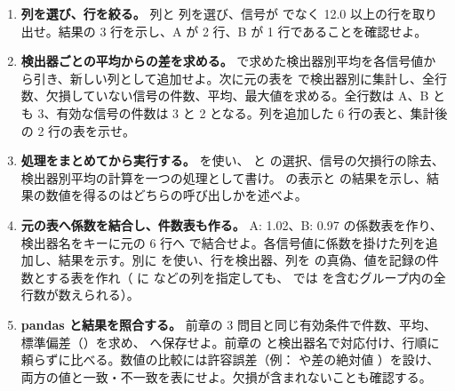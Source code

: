 \begin{enumerate}
\item \textbf{列を選び、行を絞る。}
 列と  列を選び、信号が  でなく 12.0 以上の行を取り出せ。結果の 3 行を示し、A が 2 行、B が 1 行であることを確認せよ。

\item \textbf{検出器ごとの平均からの差を求める。}
 で求めた検出器別平均を各信号値から引き、新しい列として追加せよ。次に元の表を  で検出器別に集計し、全行数、欠損していない信号の件数、平均、最大値を求める。全行数は A、B とも 3、有効な信号の件数は 3 と 2 となる。列を追加した 6 行の表と、集計後の 2 行の表を示せ。

\item \textbf{処理をまとめてから実行する。}
 を使い、 と  の選択、信号の欠損行の除去、検出器別平均の計算を一つの処理として書け。 の表示と  の結果を示し、結果の数値を得るのはどちらの呼び出しかを述べよ。

\item \textbf{元の表へ係数を結合し、件数表も作る。}
A: 1.02、B: 0.97 の係数表を作り、検出器名をキーに元の 6 行へ  で結合せよ。各信号値に係数を掛けた列を追加し、結果を示す。別に  を使い、行を検出器、列を  の真偽、値を記録の件数とする表を作れ（ に  などの列を指定しても、 では  を含むグループ内の全行数が数えられる）。

\item \textbf{pandas と結果を照合する。}
前章の 3 問目と同じ有効条件で件数、平均、標準偏差（）を求め、 へ保存せよ。前章の  と検出器名で対応付け、行順に頼らずに比べる。数値の比較には許容誤差（例： や差の絶対値 ）を設け、両方の値と一致・不一致を表にせよ。欠損が含まれないことも確認する。

\end{enumerate}
